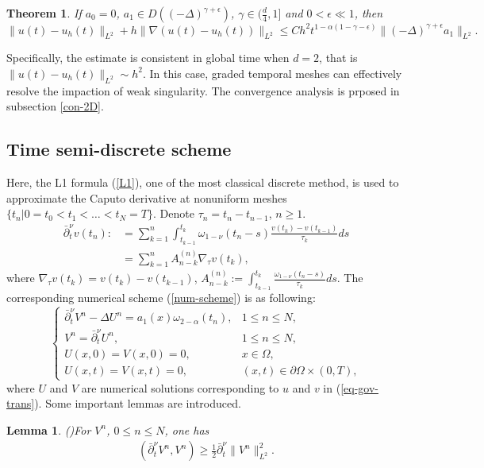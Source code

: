 \documentclass[11pt]{article}
\newtheorem{theorem}{Theorem}
\newtheorem{lemma}{Lemma}[section]
\numberwithin{equation}{section}
\begin{document}
\begin{theorem}\label{thm-semi-space}
If $a_0=0$, $a_1\in D((-\Delta)^{\gamma+\epsilon})$, $\gamma\in(\frac{d}{4},1]$ and $0<\epsilon \ll 1$, then
\[
\|u(t)-u_h(t)\|_{L^2}+h\|\nabla(u(t)-u_h(t))\|_{L^2} \leq Ch^2t^{1-\alpha(1-\gamma-\epsilon)}\|(-\Delta)^{\gamma+\epsilon}a_1\|_{L^2}.
\] 
\end{theorem}
Specifically, the estimate is consistent in global time when $d=2$, that is $\|u(t)-u_h(t)\|_{L^2}\sim h^2$.
In this case, graded temporal meshes can effectively resolve the impaction of weak singularity. The convergence analysis is prposed in subsection \ref{con-2D}.


\subsection{Time semi-discrete scheme}
Here, the L1 formula (\ref{L1}), one of the most classical discrete method, is used to approximate the Caputo derivative at nonuniform meshes $\{t_n|0=t_0<t_1<\dots <t_N=T\}$. Denote $\tau_n=t_n-t_{n-1}$, $n\geq1$.
\begin{align}\nonumber
\bar\partial_t^\nu v(t_n)
:&= \sum_{k=1}^{n}\int_{t_{k-1}}^{t_k}\omega_{1-\nu}(t_n-s)\frac{v(t_k)-v(t_{k-1})}{\tau_k}ds\\ \label{L1}
&=\sum_{k=1}^nA_{n-k}^{(n)}\nabla_\tau v(t_k),
\end{align}
where $\nabla_\tau v(t_k)=v(t_k)-v(t_{k-1})$, $A_{n-k}^{(n)}:=\int_{t_{k-1}}^{t_k}\frac{\omega_{1-\nu}(t_n-s)}{\tau_k}ds$. The corresponding numerical scheme (\ref{num-scheme})  is as following:
\begin{equation}\label{num-scheme}
\begin{cases}
  \bar\partial_t^\nu V^n - \Delta U^n = a_1(x)\omega_{2-\alpha}(t_n), & 1\le n \le N, \\
  V^n  = \bar\partial_t^\nu U^n, & 1\le n \le N, \\
  U(x,0) = V(x,0)=0, & x \in \Omega, \\
  U(x,t) = V(x,t)=0, & (x,t) \in \partial \Omega \times (0,T),
\end{cases}
\end{equation}
where $U$ and $V$ are numerical solutions corresponding to $u$ and $v$ in (\ref{eq-gov-trans}). Some important lemmas are introduced.

\begin{lemma}\label{FD-ineq}
(\cite{LiaoH2018L1})For $V^n$, $0\leq n\leq N$, one has
\begin{align*}
(\bar\partial_t^\nu V^n,V^n)\geq \frac{1}{2}\bar\partial_t^\nu \|V^n\|_{L^2}^2.    
\end{align*}
\end{lemma}
\end{document}
